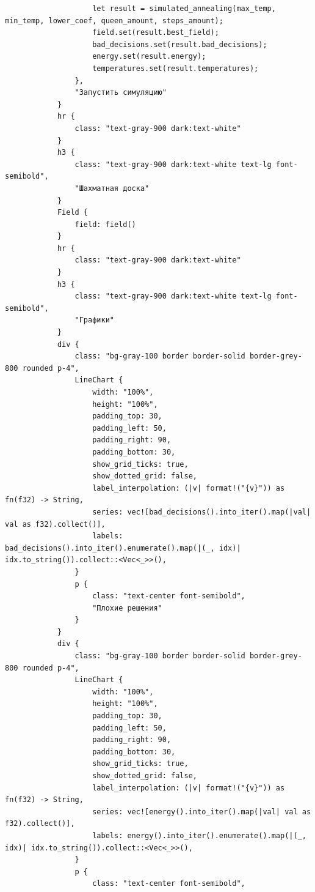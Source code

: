 \documentclass[a4paper,14pt]{extarticle}
\begin{document}
\begin{verbatim}
                    let result = simulated_annealing(max_temp, min_temp, lower_coef, queen_amount, steps_amount);
                    field.set(result.best_field);
                    bad_decisions.set(result.bad_decisions);
                    energy.set(result.energy);
                    temperatures.set(result.temperatures);
                },
                "Запустить симуляцию"
            }
            hr { 
                class: "text-gray-900 dark:text-white"
            }
            h3 {
                class: "text-gray-900 dark:text-white text-lg font-semibold",
                "Шахматная доска"
            }
            Field {
                field: field()
            }
            hr { 
                class: "text-gray-900 dark:text-white"
            }
            h3 {
                class: "text-gray-900 dark:text-white text-lg font-semibold",
                "Графики"
            }
            div {
                class: "bg-gray-100 border border-solid border-grey-800 rounded p-4",
                LineChart {
                    width: "100%",
                    height: "100%",
                    padding_top: 30,
                    padding_left: 50,
                    padding_right: 90,
                    padding_bottom: 30,
                    show_grid_ticks: true,
                    show_dotted_grid: false,
                    label_interpolation: (|v| format!("{v}")) as fn(f32) -> String,
                    series: vec![bad_decisions().into_iter().map(|val| val as f32).collect()],
                    labels: bad_decisions().into_iter().enumerate().map(|(_, idx)| idx.to_string()).collect::<Vec<_>>(),
                }
                p {
                    class: "text-center font-semibold",
                    "Плохие решения"
                }
            }
            div {
                class: "bg-gray-100 border border-solid border-grey-800 rounded p-4",
                LineChart {
                    width: "100%",
                    height: "100%",
                    padding_top: 30,
                    padding_left: 50,
                    padding_right: 90,
                    padding_bottom: 30,
                    show_grid_ticks: true,
                    show_dotted_grid: false,
                    label_interpolation: (|v| format!("{v}")) as fn(f32) -> String,
                    series: vec![energy().into_iter().map(|val| val as f32).collect()],
                    labels: energy().into_iter().enumerate().map(|(_, idx)| idx.to_string()).collect::<Vec<_>>(),
                }
                p {
                    class: "text-center font-semibold",

\end{verbatim}
\end{document}
